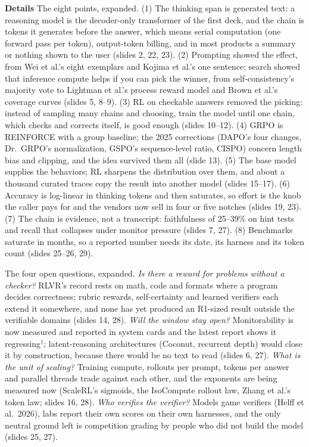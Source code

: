\documentclass[11pt,letterpaper]{article}
\newcommand{\para}[1]{\medskip\noindent\textbf{#1}\quad}
\begin{document}
\para{Details} The eight points, expanded. (1) The thinking span is generated text: a reasoning model is the decoder-only transformer of the first deck, and the chain is tokens it generates before the answer, which means serial computation (one forward pass per token), output-token billing, and in most products a summary or nothing shown to the user (slides 2, 22, 23). (2) Prompting showed the effect, from Wei et al.'s eight exemplars and Kojima et al.'s one sentence; search showed that inference compute helps if you can pick the winner, from self-consistency's majority vote to Lightman et al.'s process reward model and Brown et al.'s coverage curves (slides 5, 8--9). (3) RL on checkable answers removed the picking: instead of sampling many chains and choosing, train the model until one chain, which checks and corrects itself, is good enough (slides 10--12). (4) GRPO is REINFORCE with a group baseline; the 2025 corrections (DAPO's four changes, Dr.\ GRPO's normalization, GSPO's sequence-level ratio, CISPO) concern length bias and clipping, and the idea survived them all (slide 13). (5) The base model supplies the behaviors; RL sharpens the distribution over them, and about a thousand curated traces copy the result into another model (slides 15--17). (6) Accuracy is log-linear in thinking tokens and then saturates, so effort is the knob the caller pays for and the vendors now sell in four or five notches (slides 19, 23). (7) The chain is evidence, not a transcript: faithfulness of 25--39\% on hint tests and recall that collapses under monitor pressure (slides 7, 27). (8) Benchmarks saturate in months, so a reported number needs its date, its harness and its token count (slides 25--26, 29).

The four open questions, expanded. \emph{Is there a reward for problems without a checker?} RLVR's record rests on math, code and formats where a program decides correctness; rubric rewards, self-certainty and learned verifiers each extend it somewhere, and none has yet produced an R1-sized result outside the verifiable domains (slides 14, 28). \emph{Will the window stay open?} Monitorability is now measured and reported in system cards and the latest report shows it regressing$^\dagger$; latent-reasoning architectures (Coconut, recurrent depth) would close it by construction, because there would be no text to read (slides 6, 27). \emph{What is the unit of scaling?} Training compute, rollouts per prompt, tokens per answer and parallel threads trade against each other, and the exponents are being measured now (ScaleRL's sigmoids, the IsoCompute rollout law, Zhang et al.'s token law; slides 16, 28). \emph{Who verifies the verifier?} Models game verifiers (Helff et al.\ 2026), labs report their own scores on their own harnesses, and the only neutral ground left is competition grading by people who did not build the model (slides 25, 27).
\end{document}
